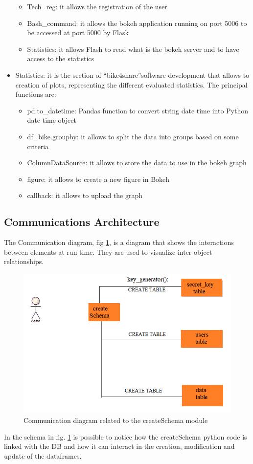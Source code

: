\documentclass{article}
\begin{document}
\begin{itemize}
\begin{itemize}
         \item Tech\_reg: it allows the registration of the user
         \item Bash\_command: it allows the bokeh application running on port 5006 to be accessed at port 5000 by Flask
         \item Statistics: it allows Flash to read what is the bokeh server and to have access to the statistics
     \end{itemize}
     \item Statistics: it is the section of “bike4share”software development that  allows to creation of plots, representing the different evaluated statistics. The principal functions are:
     \begin{itemize}
          \item pd.to\_datetime: Pandas function to convert string date time into Python date time object
          \item df\_bike.groupby: it allows to split the data into groups based on some criteria
          \item ColumnDataSource: it allows to store the data to use in the bokeh graph
          \item figure: it allows to create a new figure in Bokeh
          \item callback: it allows to upload the graph 
     \end{itemize}
\end{itemize}

      
\subsection{Communications Architecture}
The Communication diagram, fig \ref{fig:createSchema}, is a diagram that shows the interactions between elements at run-time. They  are used to visualize inter-object relationships.

\begin{figure}[h]
    \centering
    \includegraphics[width=0.75\linewidth]{image/COMM_TAB.png}
    \caption{Communication diagram related to the createSchema module}
    \label{fig:createSchema}
\end{figure}
In the schema in fig. \ref{fig:createSchema} is possible to notice how the createSchema python code is linked with the DB and how it can interact in the creation, modification and update of the dataframes.
\end{document}

